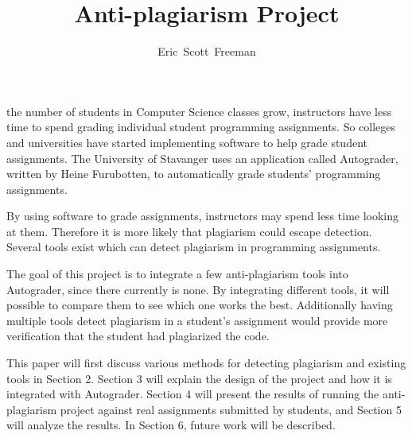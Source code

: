 \documentclass[10pt,journal,compsoc]{IEEEtran}
\begin{document}
	\title{Anti-plagiarism Project}
	\author{Eric~Scott~Freeman}


	\maketitle
	\IEEEdisplaynontitleabstractindextext
	\IEEEpeerreviewmaketitle

	
	 the number of students in Computer Science classes grow, instructors have less time to spend grading individual student programming assignments. So colleges and universities have started implementing software to help grade student assignments. The University of Stavanger uses an application called Autograder, written by Heine Furubotten, to automatically grade students' programming assignments.
	
	By using software to grade assignments, instructors may spend less time looking at them. Therefore it is more likely that plagiarism could escape detection. Several tools exist which can detect plagiarism in programming assignments.
	
	The goal of this project is to integrate a few anti-plagiarism tools into Autograder, since there currently is none. By integrating different tools, it will possible to compare them to see which one works the best. Additionally having multiple tools detect plagiarism in a student's assignment would provide more verification that the student had plagiarized the code.
	
	This paper will first discuss various methods for detecting plagiarism and existing tools in Section 2. Section 3 will explain the design of the project and how it is integrated with Autograder. Section 4 will present the results of running the anti-plagiarism project against real assignments submitted by students, and Section 5 will analyze the results. In Section 6, future work will be described.
\end{document}
